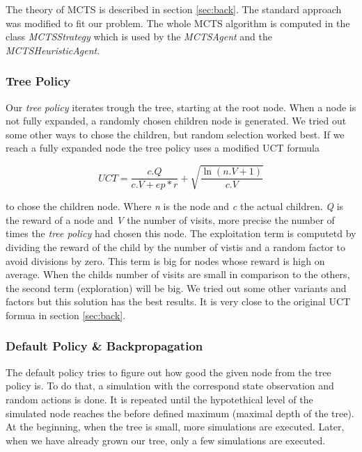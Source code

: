 The theory of \ac{MCTS} is described in section \ref{sec:back}. The standard approach was modified to fit our problem. The whole \ac{MCTS} algorithm is computed in the class \textit{MCTSStrategy} which is used by the \textit{MCTSAgent} and the \textit{MCTSHeuristicAgent}.

\subsubsection{Tree Policy}
Our \textit{tree policy} iterates trough the tree, starting at the root node. When a node is not fully expanded, a randomly chosen children node is generated. We tried out some other ways to chose the children, but random selection worked best. If we reach a fully expanded node the tree policy uses a modified \ac{UCT} formula

\begin{equation}
 	UCT = \frac{c.Q}{c.V + ep * r} + \sqrt{\frac{\ln (n.V+1)}{c.V}}
\end{equation} 

to chose the children node. Where \textit{n} is the node and \textit{c} the actual children. \textit{Q} is the reward of a node and \textit{V} the number of visits, more precise the number of times the \textit{tree policy} had chosen this node. The exploitation term is computetd by dividing the reward of the child by the number of vistis and a random factor to avoid divisions by zero. This term is big for nodes whose reward is high on average.
When the childs number of visits are small in comparison to the others, the second term (exploration) will be big. We tried out some other variants and factors but this solution has the best results. It is very close to the original \ac{UCT} formua in section \ref{sec:back}.

\subsubsection{Default Policy \& Backpropagation}

The default policy tries to figure out how good the given node from the tree policy is. To do that, a simulation with the correspond state observation and random actions is done. It is repeated until the hypotethical level of the simulated node reaches the before defined maximum (maximal depth of the tree). At the beginning, when the tree is small, more simulations are executed. Later, when we have already grown our tree, only a few simulations are executed.

